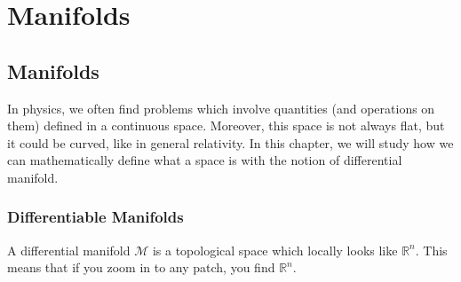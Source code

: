 \part{Manifolds}

\chapter{Manifolds}

    In physics, we often find problems which involve quantities (and operations on them) defined in a continuous space. Moreover, this space is not always flat, but it could be curved, like in general relativity. In this chapter, we will study how we can mathematically define what a space is with the notion of differential manifold.

\section{Differentiable Manifolds}

    A differential manifold $\mathcal M$ is a topological space which locally looks like $\mathbb R^n$. This means that if you zoom in to any patch, you find $\mathbb R^n$.

